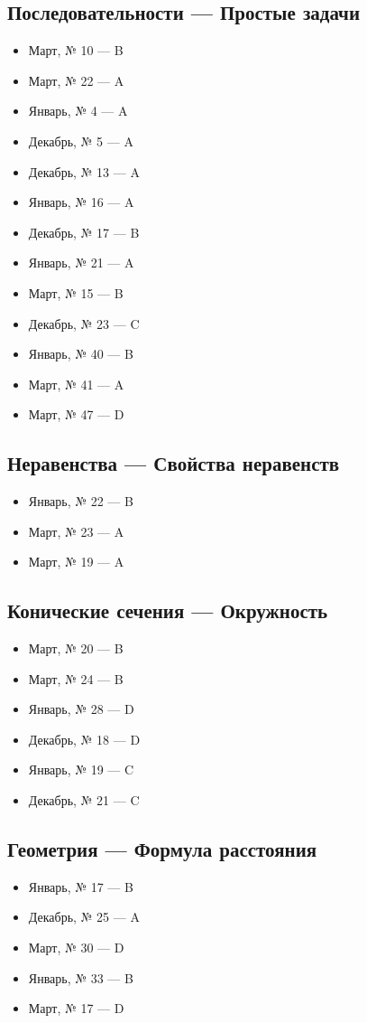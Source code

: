 \subsection*{Последовательности — Простые задачи}
\begin{itemize}
\item Март, № 10 — B
\item Март, № 22 — A
\item Январь, № 4 — A
\item Декабрь, № 5 — A
\item Декабрь, № 13 — A
\item Январь, № 16 — A
\item Декабрь, № 17 — B
\item Январь, № 21 — A
\item Март, № 15 — B
\item Декабрь, № 23 — C
\item Январь, № 40 — B
\item Март, № 41 — A
\item Март, № 47 — D
\end{itemize}

\subsection*{Неравенства — Свойства неравенств}
\begin{itemize}
\item Январь, № 22 — B
\item Март, № 23 — A
\item Март, № 19 — A
\end{itemize}

\subsection*{Конические сечения — Окружность}
\begin{itemize}
\item Март, № 20 — B
\item Март, № 24 — B
\item Январь, № 28 — D
\item Декабрь, № 18 — D
\item Январь, № 19 — C
\item Декабрь, № 21 — C
\end{itemize}

\subsection*{Геометрия — Формула расстояния}
\begin{itemize}
\item Январь, № 17 — B
\item Декабрь, № 25 — A
\item Март, № 30 — D
\item Январь, № 33 — B
\item Март, № 17 — D
\end{itemize}

